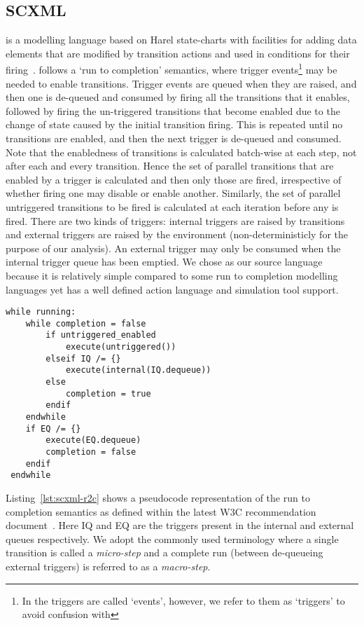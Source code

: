 
\subsection{SCXML}
\label{sec:scxml}

\SCXML is a modelling language based on Harel state-charts with facilities for adding data elements that are modified by transition actions and used in conditions for their firing~\cite{scxmlwebsite}. 
\SCXML follows a `run to completion' semantics, where trigger events\footnote{In \SCXML the triggers are called `events', however, we refer to them as `triggers' to avoid confusion with \EventB} may be needed to enable transitions.
Trigger events are queued when they are raised, and then one is de-queued and consumed by firing all the transitions that it enables, followed by firing the un-triggered transitions that become enabled due to the change of state caused by the initial transition firing.
This is repeated until no transitions are enabled, and then the next trigger is de-queued and consumed.
Note that the enabledness of transitions is calculated batch-wise at each step, not after each and every transition.
Hence the set of parallel transitions that are enabled by a trigger is calculated and then only those are fired, irrespective of whether firing one may disable or enable another.
Similarly, the set of parallel untriggered transitions to be fired is calculated at each iteration before any is fired.
There are two kinds of triggers: internal triggers are raised by transitions and external triggers are raised by the environment (non-deterministicly for the purpose of our analysis). 
An external trigger may only be consumed when the internal trigger queue has been emptied.
We chose \SCXML as our source language because it is relatively simple compared to some run to completion modelling languages yet has a well defined action language and simulation tool support.

\begin{lstlisting}[caption=Pseudocode for 'run to completion',label={lst:scxml-r2c}, frame=single, float=h]
 while running:
 	while completion = false
 		if untriggered_enabled
 			execute(untriggered())
 		elseif IQ /= {}
 			execute(internal(IQ.dequeue)) 
 		else
 			completion = true
 		endif
 	endwhile
 	if EQ /= {}
 		execute(EQ.dequeue) 
 		completion = false
 	endif
 endwhile 
\end{lstlisting}

Listing~\ref{lst:scxml-r2c} shows a pseudocode representation of the run to completion semantics as defined within the latest W3C recommendation document~\cite{scxmlwebsite}. Here IQ and EQ are the triggers present in the internal and external queues respectively. We adopt the commonly used terminology where a single transition is called a \emph{micro-step} and a complete run (between de-queueing external triggers) is referred to as a \emph{macro-step}.

